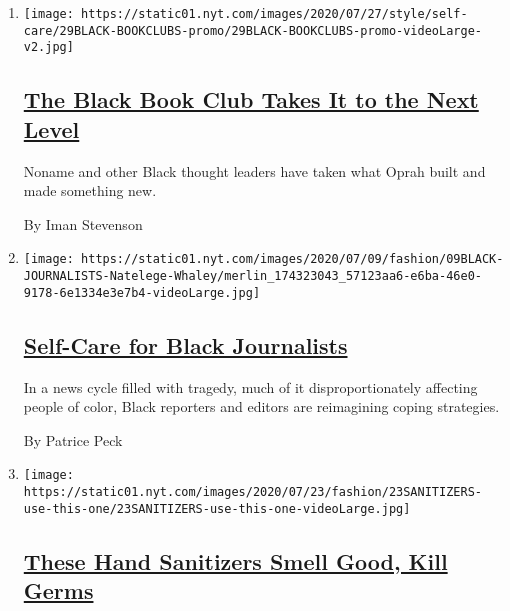 \begin{enumerate}
\def\labelenumi{\arabic{enumi}.}
\item
  \texttt{[image: https://static01.nyt.com/images/2020/07/27/style/self-care/29BLACK-BOOKCLUBS-promo/29BLACK-BOOKCLUBS-promo-videoLarge-v2.jpg]}

  \hypertarget{the-black-book-club-takes-it-to-the-next-level-1}{%
  \subsection{\texorpdfstring{\href{/2020/07/29/style/self-care/black-book-clubs.html}{The
  Black Book Club Takes It to the Next
  Level}}{The Black Book Club Takes It to the Next Level}}\label{the-black-book-club-takes-it-to-the-next-level-1}}

  Noname and other Black thought leaders have taken what Oprah built and
  made something new.

  By Iman Stevenson
\item
  \texttt{[image: https://static01.nyt.com/images/2020/07/09/fashion/09BLACK-JOURNALISTS-Natelege-Whaley/merlin\_174323043\_57123aa6-e6ba-46e0-9178-6e1334e3e7b4-videoLarge.jpg]}

  \hypertarget{self-care-for-black-journalists}{%
  \subsection{\texorpdfstring{\href{/2020/07/14/style/self-care/black-journalists.html}{Self-Care
  for Black
  Journalists}}{Self-Care for Black Journalists}}\label{self-care-for-black-journalists}}

  In a news cycle filled with tragedy, much of it disproportionately
  affecting people of color, Black reporters and editors are reimagining
  coping strategies.

  By Patrice Peck
\item
  \texttt{[image: https://static01.nyt.com/images/2020/07/23/fashion/23SANITIZERS-use-this-one/23SANITIZERS-use-this-one-videoLarge.jpg]}

  \hypertarget{these-hand-sanitizers-smell-good-kill-germs}{%
  \subsection{\texorpdfstring{\href{/2020/07/22/style/these-hand-sanitizers-smell-good-kill-germs.html}{These
  Hand Sanitizers Smell Good, Kill
  Germs}}{These Hand Sanitizers Smell Good, Kill Germs}}\label{these-hand-sanitizers-smell-good-kill-germs}}


\end{enumerate}
